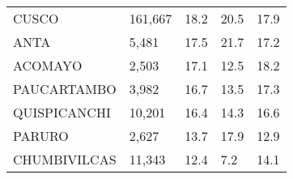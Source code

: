\begin{tabular}{lllll}
	\cellcolor[HTML]{FF5050}CUSCO                                  & 161,667                                                               & 18.2                                                                             & 20.5                                                                        & 17.9                                                                                \\
	\cellcolor[HTML]{FF5050}ANTA                                   & 5,481                                                                 & 17.5                                                                             & 21.7                                                                        & 17.2                                                                                \\
	\cellcolor[HTML]{FF5050}ACOMAYO                                & 2,503                                                                 & 17.1                                                                             & 12.5                                                                        & 18.2                                                                                \\
	\cellcolor[HTML]{FF5050}PAUCARTAMBO                            & 3,982                                                                 & 16.7                                                                             & 13.5                                                                        & 17.3                                                                                \\
	\cellcolor[HTML]{FF5050}QUISPICANCHI                           & 10,201                                                                & 16.4                                                                             & 14.3                                                                        & 16.6                                                                                \\
	\cellcolor[HTML]{FF5050}PARURO                                 & 2,627                                                                 & 13.7                                                                             & 17.9                                                                        & 12.9                                                                                \\
	\cellcolor[HTML]{FF5050}CHUMBIVILCAS                           & 11,343                                                                & 12.4                                                                             & 7.2                                                                         & 14.1                                                                                \\

\end{tabular}
